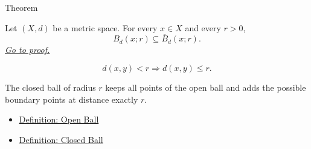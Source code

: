 \begin{theorembox}{Theorem}
\begin{theorem}
\label{thm:metric-closed-balls-contain-open-balls}
Let \((X,d)\) be a metric space.  For every \(x
\in X\) and every \(r>0\),
\[
  B_d(x;r)\subseteq \overline{B}_d(x;r).
\]
\hyperref[prf:metric-closed-balls-contain-open-balls]{\textit{Go to proof.}}
\end{theorem}
\end{theorembox}


\begin{remark*}
\[
d(x,y)<r
\Longrightarrow
d(x,y)\leq r.
\]
\end{remark*}

\begin{remark*}[Interpretation]
The closed ball of radius \(r\) keeps all points of the open ball and adds
the possible boundary points at distance exactly \(r\).
\end{remark*}

\begin{dependencies}
\begin{itemize}
  \item \hyperref[def:metric-open-ball]{Definition: Open Ball}
  \item \hyperref[def:metric-closed-ball]{Definition: Closed Ball}
\end{itemize}
\end{dependencies}
